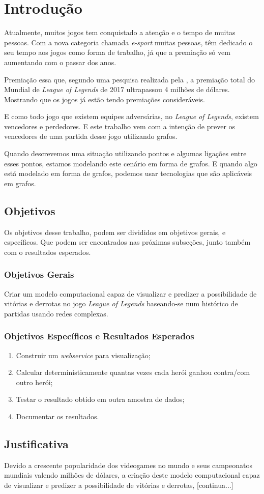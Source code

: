 \chapter{Introdução}
\label{chap:Introducao}

Atualmente, muitos jogos tem conquistado a atenção e o tempo de muitas pessoas. Com a nova categoria chamada \textit{e-sport} muitas pessoas, têm dedicado o seu tempo aos jogos como forma de trabalho, já que a premiação só vem aumentando com o passar dos anos.

Premiação essa que, segundo uma pesquisa realizada pela \citet{espn}, a premiação total do Mundial de \textit{League of Legends} de 2017 ultrapassou 4 milhões de dólares. Mostrando que os jogos já estão tendo premiações consideráveis.

E como todo jogo que existem equipes adversárias, no \textit{League of Legends}, existem vencedores e perdedores. E este trabalho vem com a intenção de prever os vencedores de uma partida desse jogo utilizando grafos.

Quando descrevemos uma situação utilizando pontos e algumas ligações entre esses pontos, estamos modelando este cenário em forma de grafos. E quando algo está modelado em forma de grafos, podemos usar tecnologias que são aplicáveis em grafos.

\section{Objetivos}
Os objetivos desse trabalho, podem ser divididos em objetivos gerais, e específicos. Que podem ser encontrados nas próximas subseções, junto também com o resultados esperados.
\subsection{Objetivos Gerais}
Criar um modelo computacional capaz de visualizar e predizer a possibilidade de vitórias e derrotas no jogo \textit{League of Legends} baseando-se num histórico de partidas usando redes complexas.

\subsection{Objetivos Específicos e Resultados Esperados}

\begin{enumerate}
\item Construir um \textit{webservice} para visualização;
\item Calcular deterministicamente quantas vezes cada herói ganhou contra/com outro herói;
\item Testar o resultado obtido em outra amostra de dados;
\item Documentar os resultados.

\end{enumerate}

\section{Justificativa}
Devido a crescente popularidade dos videogames no mundo e seus campeonatos mundiais valendo milhões de dólares, a criação deste modelo computacional capaz de visualizar e predizer a possibilidade de vitórias e derrotas, [continua...]